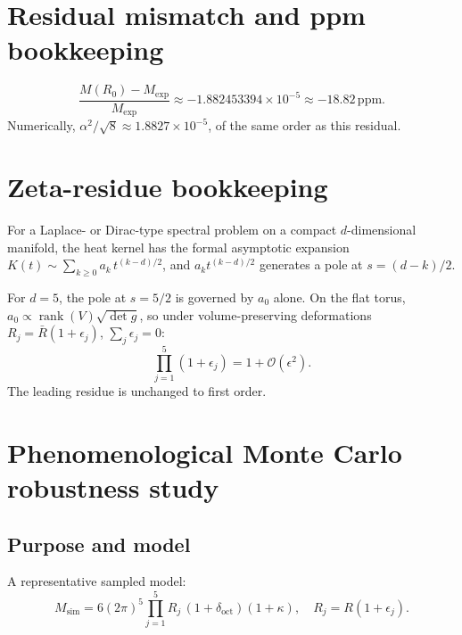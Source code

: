 \documentclass[11pt,a4paper]{article}
\begin{document}
\section{Residual mismatch and ppm bookkeeping}
\[
  \frac{M(R_0)-M_{\mathrm{exp}}}{M_{\mathrm{exp}}}
  \approx -1.882453394\times10^{-5}
  \approx -18.82\,\mathrm{ppm}.
\]
Numerically,
$\alpha^2/\sqrt{8}\approx 1.8827\times10^{-5}$,
of the same order as this residual.

\section{Zeta-residue bookkeeping}
For a Laplace- or Dirac-type spectral problem on a compact $d$-dimensional manifold,
the heat kernel has the formal asymptotic expansion
$K(t)\sim\sum_{k\geq0}a_k\,t^{(k-d)/2}$,
and $a_k t^{(k-d)/2}$ generates a pole at $s=(d-k)/2$.

For $d=5$, the pole at $s=5/2$ is governed by $a_0$ alone.  On the flat torus,
$a_0\propto\operatorname{rank}(V)\sqrt{\det g}$, so under volume-preserving
deformations $R_j=\bar R(1+\epsilon_j)$, $\sum_j\epsilon_j=0$:
\[
  \prod_{j=1}^5(1+\epsilon_j) = 1+\mathcal{O}(\epsilon^2).
\]
The leading residue is unchanged to first order.

\section{Phenomenological Monte Carlo robustness study}
\subsection{Purpose and model}
A representative sampled model:
\begin{equation}\label{eq:mcsampled}
  M_{\mathrm{sim}} = 6(2\pi)^5\prod_{j=1}^5 R_j\,(1+\delta_{\mathrm{oct}})(1+\kappa),
  \quad R_j=R(1+\epsilon_j).
\end{equation}
\end{document}
